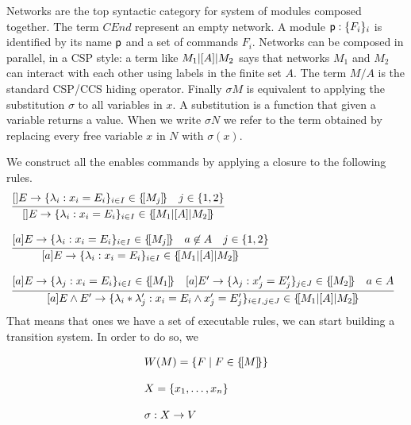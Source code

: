 Networks are the top syntactic category for system of modules composed
together. The term $CEnd$ represent an empty network. A module
$\textsf{p}:\{F_i\}_i$ is identified by its name $\textsf{p}$ and a set of
commands $F_i$. Networks can be composed in parallel, in a CSP style:
a term like $M_1 |[A]| M_2$ says that networks $M_1$ and $M_2$ can
interact with each other using labels in the finite set $A$. The term
$M/A$ is the standard CSP/CCS hiding operator. Finally $\sigma M$ is
equivalent to applying the substitution $\sigma$ to all variables in
$x$. A substitution is a function that given a variable returns a
value. When we write $\sigma N$ we refer to the term obtained by
replacing every free variable $x$ in $N$ with $\sigma(x)$. 


 We construct all the enables commands by applying a
closure to the following rules.
% 
\begin{displaymath}
  \begin{array}{lll}
    \infer[]
    {\cmd{}E{\lambda_i}{x_i}{E_i}{i\in I}\in \sem{M_1\ppp A M_2}}
    {\cmd{}E{\lambda_i}{x_i}{E_i}{i\in I}\in \sem{M_j}
    & j\in\{1,2\}}
    \\\\
    \infer[]
    {\cmd aE{\lambda_i}{x_i}{E_i}{i\in I}\in \sem{M_1\ppp A M_2}}
    {\cmd aE{\lambda_i}{x_i}{E_i}{i\in I}\in \sem{M_j}
    & a\not\in A    & j\in\{1,2\}}
    \\\\
    \infer[]
    {
    [a] E\land E' \rightarrow \{\lambda_i * \lambda_j': x_i = E_i \land x_j' = E_j' \}_{i\in I, j\in J}
    \in \sem{M_1\ppp A M_2}
    }
    {\cmd aE{\lambda_j}{x_i}{E_i}{i\in I}\in \sem{M_1}{}
    & \cmd a{E'}{\lambda_j}{x_j'}{E_j'}{j\in J}\in \sem{M_2}{}
    & a\in A}
  \end{array}
\end{displaymath}
That means that ones we have a set of executable rules, we can start
building a transition system. In order to do so, we


\begin{displaymath}
  \begin{array}{lll}
    W(M) = \{F \mid F\in\{\![M]\!\}\}
    \\\\
    X = \{x_1,\ldots,x_n\}
    \\\\
    \sigma : X \rightarrow V
  \end{array}
\end{displaymath}




